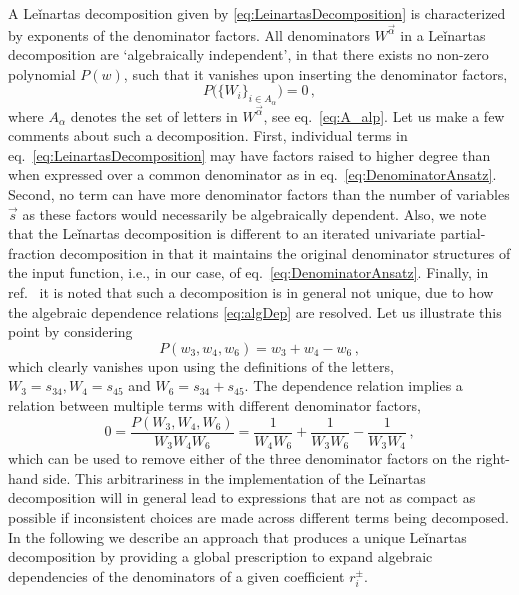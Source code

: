 A Leǐnartas decomposition given by \cref{eq:LeinartasDecomposition}
is characterized by exponents of the denominator factors. 
All denominators $W^{\vec \alpha}$
in a Leǐnartas decomposition  are `algebraically independent', in that
there exists no non-zero polynomial  
$P(w)$, such that it vanishes upon inserting the denominator factors, 
\begin{equation}\label{eq:algDep}
P\big(\{ W_i \}_{i\in A_\alpha}\big )=0\,,
\end{equation}
where $A_\alpha$ denotes the set of letters in $W^{\vec \alpha}$, see eq.~\eqref{eq:A_alp}.
Let us make a few comments about such a decomposition.  First, individual terms
in eq.~\eqref{eq:LeinartasDecomposition} may have factors raised to higher
degree than when expressed over a common denominator as in 
eq.~\eqref{eq:DenominatorAnsatz}. Second, no term can have
more denominator factors than the number of variables $\vec s$ as these factors would
necessarily be algebraically dependent.  Also, we note that the Leǐnartas
decomposition is different to an iterated univariate partial-fraction decomposition in that
it maintains the original denominator structures of the input 
function, i.e., in our case, of eq.~\eqref{eq:DenominatorAnsatz}. Finally, in
ref.~\cite{raichev2012leinartas} it is noted that such a
decomposition is in general not unique, due to how the algebraic dependence relations
\eqref{eq:algDep} are resolved.
Let us illustrate this point by considering
\begin{equation} 
P(w_3,w_4,w_6)=w_3 + w_4 - w_6\,,
\end{equation} 
which clearly vanishes upon 
using the definitions of the letters, 
$W_3=s_{34}, W_4=s_{45} $ and 
$W_6 =s_{34} + s_{45}$. 
The dependence relation implies a relation between multiple terms with different denominator factors,
\begin{equation}\label{eq:arbitraryLeinartas}
0= \frac{P(W_3,W_4,W_6)}{W_3 W_4 W_6} 
= \frac{1}{W_4 W_6} + \frac{1}{W_3 W_6} - \frac{1}{W_3 W_4}\,, 
\end{equation}
which can be used to remove either of the three denominator factors on the right-hand side.
This arbitrariness in the implementation of the Leǐnartas decomposition will
in general lead to expressions that are not as compact as possible if inconsistent choices
are made across different terms being decomposed.
In the following we describe
an approach that produces a unique Leǐnartas decomposition by providing 
a global prescription to expand algebraic dependencies of the denominators of a given
coefficient $r_i^{\pm}$.

